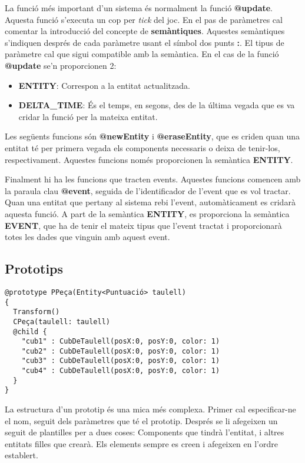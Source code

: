 La funció més important d'un sistema és normalment la funció {\bf @update}. Aquesta funció s'executa un cop per {\em tick} del joc. En el pas de paràmetres cal comentar la introducció del concepte de {\bf semàntiques}. Aquestes semàntiques s'indiquen després de cada paràmetre usant el símbol dos punts {\bf :}. El tipus de paràmetre cal que sigui compatible amb la semàntica. En el cas de la funció {\bf @update} se'n proporcionen 2:

\begin{itemize}
  \item {\bf ENTITY}: Correspon a la entitat actualitzada.
  \item {\bf DELTA\_TIME}: És el temps, en segons, des de la última vegada que es va cridar la funció per la mateixa entitat.
\end{itemize}

Les següents funcions són {\bf @newEntity} i {\bf @eraseEntity}, que es criden quan una entitat té per primera vegada els components necessaris o deixa de tenir-los, respectivament. Aquestes funcions només proporcionen la semàntica {\bf ENTITY}.

Finalment hi ha les funcions que tracten events. Aquestes funcions comencen amb la paraula clau {\bf @event}, seguida de l'identificador de l'event que es vol tractar. Quan una entitat que pertany al sistema rebi l'event, automàticament es cridarà aquesta funció. A part de la semàntica {\bf ENTITY}, es proporciona la semàntica {\bf EVENT}, que ha de tenir el mateix tipus que l'event tractat i proporcionarà totes les dades que vinguin amb aquest event.

\subsection{Prototips}

\begin{verbatim}
@prototype PPeça(Entity<Puntuació> taulell)
{
  Transform()
  CPeça(taulell: taulell)
  @child {
    "cub1" : CubDeTaulell(posX:0, posY:0, color: 1)
    "cub2" : CubDeTaulell(posX:0, posY:0, color: 1)
    "cub3" : CubDeTaulell(posX:0, posY:0, color: 1)
    "cub4" : CubDeTaulell(posX:0, posY:0, color: 1)
  }
}
\end{verbatim}

La estructura d'un prototip és una mica més complexa. Primer cal especificar-ne el nom, seguit dels paràmetres que té el prototip. Després se li afegeixen un seguit de plantilles per a dues coses: Components que tindrà l'entitat, i altres entitats filles que crearà. Els elements sempre es creen i afegeixen en l'ordre establert.

